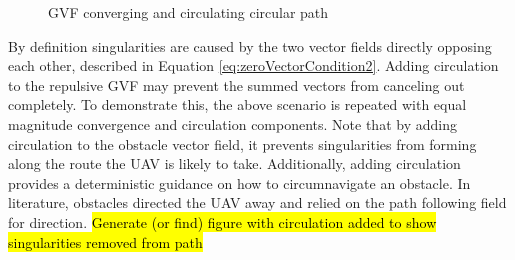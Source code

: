 \documentclass[numbered,pdftex]{ohio-etd}
\begin{document}
\begin{figure}[H]
	\begin{subfigmatrix}{2}%
		\centering	
		\hspace*{0mm}
	\end{subfigmatrix}
	\caption{GVF converging and circulating circular path}
	\label{fig:noCircSingularityDetection}
\end{figure}

By definition singularities are caused by the two vector fields directly opposing each other, described in Equation \ref{eq:zeroVectorCondition2}. Adding circulation to the repulsive GVF may prevent the summed vectors from canceling out completely. To demonstrate this, the above scenario is repeated with equal magnitude convergence and circulation components. Note that by adding circulation to the obstacle vector field, it prevents singularities from forming along the route the UAV is likely to take. Additionally, adding circulation provides a deterministic guidance on how to circumnavigate an obstacle. In literature, obstacles directed the UAV away and relied on the path following field for direction.
\hl{Generate (or find) figure with circulation added to show singularities removed from path}
\end{document}
